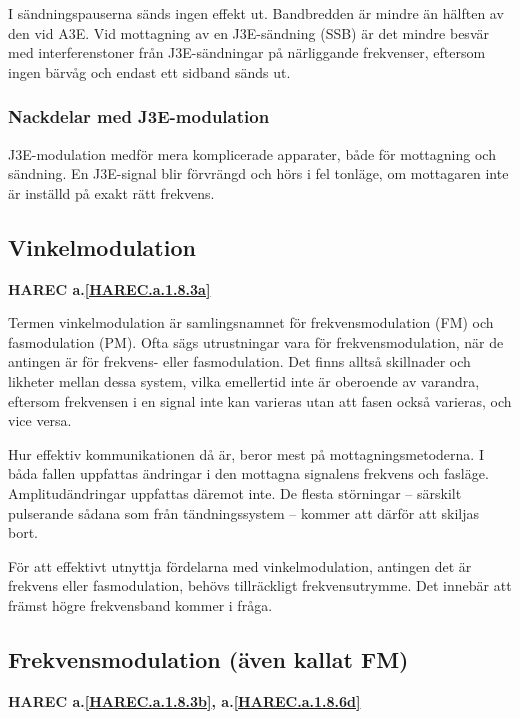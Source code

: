 I sändningspauserna sänds ingen effekt ut.
Bandbredden är mindre än hälften av den vid A3E.
Vid mottagning av en J3E-sändning (SSB) är det mindre besvär med
interferenstoner från J3E-sändningar på närliggande frekvenser, eftersom ingen
bärvåg och endast ett sidband sänds ut.

\subsubsection{Nackdelar med J3E-modulation}
J3E-modulation medför mera komplicerade apparater, både för mottagning och
sändning.
En J3E-signal blir förvrängd och hörs i fel tonläge, om mottagaren
inte är inställd på exakt rätt frekvens.

\subsection{Vinkelmodulation}
\textbf{HAREC a.\ref{HAREC.a.1.8.3a}\label{myHAREC.a.1.8.3a}}

Termen vinkelmodulation är samlingsnamnet för frekvensmodulation (FM) och
fasmodulation (PM).
Ofta sägs utrustningar vara för frekvensmodulation, när de antingen är för
frekvens- eller fasmodulation.
Det finns alltså skillnader och likheter mellan dessa system, vilka emellertid
inte är oberoende av varandra, eftersom frekvensen i en signal inte kan
varieras utan att fasen också varieras, och vice versa.

Hur effektiv kommunikationen då är, beror mest på mottagningsmetoderna.
I båda fallen uppfattas ändringar i den mottagna signalens frekvens och fasläge.
Amplitudändringar uppfattas däremot inte.
De flesta störningar -- särskilt pulserande sådana som från tändningssystem --
kommer att därför att skiljas bort.

För att effektivt utnyttja fördelarna med vinkelmodulation, antingen det är
frekvens eller fasmodulation, behövs tillräckligt frekvensutrymme.
Det innebär att främst högre frekvensband kommer i fråga.

\subsection{Frekvensmodulation (även kallat FM)}
\textbf{HAREC
  a.\ref{HAREC.a.1.8.3b}\label{myHAREC.a.1.8.3b},
  a.\ref{HAREC.a.1.8.6d}\label{myHAREC.a.1.8.6d}
}


